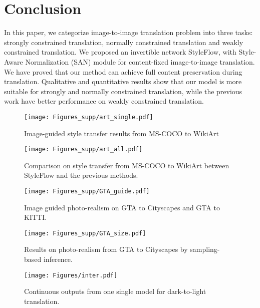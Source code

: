 \documentclass[runningheads]{llncs}
\begin{document}
\section{Conclusion}
In this paper, we categorize image-to-image translation problem into three tasks: strongly constrained translation, normally constrained translation and weakly constrained translation. We proposed an invertible network StyleFlow, with Style-Aware Normalization (SAN) module for content-fixed image-to-image translation. We have proved that our method can achieve full content preservation during translation. Qualitative and quantitative results show that our model is more suitable for strongly and normally constrained translation, while the previous work have better performance on weakly constrained translation.


\begin{figure*}
  \centering
  \texttt{[image: Figures\_supp/art\_single.pdf]}
  \caption{Image-guided style transfer results from MS-COCO\cite{lin2014microsoft} to WikiArt\cite{wikiart}}
  \label{fig:ars}
\end{figure*}

\begin{figure*}
  \centering
  \texttt{[image: Figures\_supp/art\_all.pdf]}
  \caption{Comparison on style transfer from MS-COCO\cite{lin2014microsoft} to WikiArt\cite{wikiart} between StyleFlow and the previous methods.}
  \label{fig:art_all}
\end{figure*}

\begin{figure*}
  \centering
  \texttt{[image: Figures\_supp/GTA\_guide.pdf]}
  \caption{Image guided photo-realism on GTA\cite{richter2016playing} to Cityscapes\cite{cordts2016cityscapes} and GTA to KITTI\cite{geiger2015kitti}.}
  \label{fig:gg}
\end{figure*}

\begin{figure*}
  \centering
  \texttt{[image: Figures\_supp/GTA\_size.pdf]}
  \caption{Results on photo-realism from GTA\cite{richter2016playing} to Cityscapes\cite{cordts2016cityscapes} by sampling-based inference.}
  \label{fig:gs}
\end{figure*}

\begin{figure*}
  \centering
  \texttt{[image: Figures/inter.pdf]}
  \caption{Continuous outputs from one single model for dark-to-light translation.}
  \label{fig:interpolation}
\end{figure*}
\end{document}
